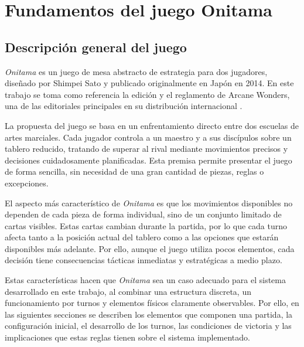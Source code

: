 \chapter{Fundamentos del juego Onitama}
\label{chap:fundamentos-juego-onitama}

\section{Descripción general del juego}
\label{sec:descripcion-general-onitama}

\textit{Onitama} es un juego de mesa abstracto de estrategia para dos jugadores, diseñado por Shimpei Sato y publicado originalmente en Japón en 2014. En este trabajo se toma como referencia la edición y el reglamento de Arcane Wonders, una de las editoriales principales en su distribución internacional \cite{onitama_bgg,onitama_rulebook}.

La propuesta del juego se basa en un enfrentamiento directo entre dos escuelas de artes marciales. Cada jugador controla a un maestro y a sus discípulos sobre un tablero reducido, tratando de superar al rival mediante movimientos precisos y decisiones cuidadosamente planificadas. Esta premisa permite presentar el juego de forma sencilla, sin necesidad de una gran cantidad de piezas, reglas o excepciones.

El aspecto más característico de \textit{Onitama} es que los movimientos disponibles no dependen de cada pieza de forma individual, sino de un conjunto limitado de cartas visibles. Estas cartas cambian durante la partida, por lo que cada turno afecta tanto a la posición actual del tablero como a las opciones que estarán disponibles más adelante. Por ello, aunque el juego utiliza pocos elementos, cada decisión tiene consecuencias tácticas inmediatas y estratégicas a medio plazo.

Estas características hacen que \textit{Onitama} sea un caso adecuado para el sistema desarrollado en este trabajo, al combinar una estructura discreta, un funcionamiento por turnos y elementos físicos claramente observables. Por ello, en las siguientes secciones se describen los elementos que componen una partida, la configuración inicial, el desarrollo de los turnos, las condiciones de victoria y las implicaciones que estas reglas tienen sobre el sistema implementado.


